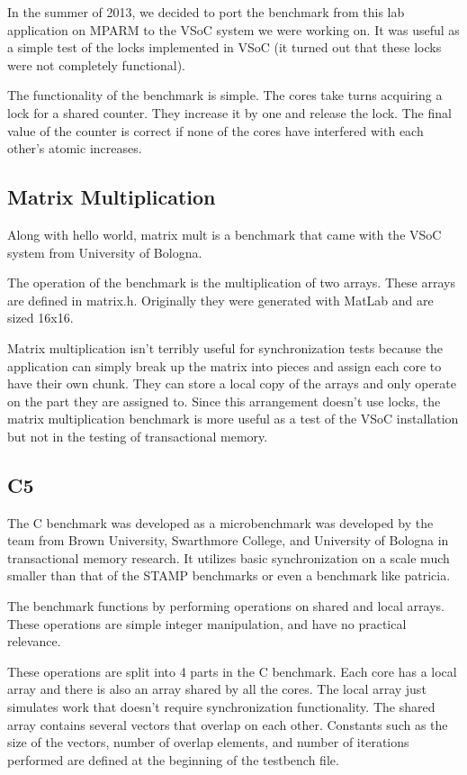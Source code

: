 \documentclass{article}
\begin{document}
In the summer of 2013, we decided to port the benchmark from this lab 
application on MPARM to the VSoC system we were working on.  It was useful as 
a simple test of the locks implemented in VSoC (it turned out that these locks 
were not completely functional).

The functionality of the benchmark is simple. The cores take turns acquiring a 
lock for a shared counter. They increase it by one and release the lock. The 
final value of the counter is correct if none of the cores have interfered 
with each other's atomic increases.

\subsection{Matrix Multiplication}

Along with hello world, matrix mult is a benchmark that came with the VSoC 
system from University of Bologna. 

The operation of the benchmark is the multiplication of two arrays. These 
arrays are defined in matrix.h. Originally they were generated with MatLab and 
are sized 16x16. 

Matrix multiplication isn't terribly useful for synchronization tests because 
the application can simply break up the matrix into pieces and assign each 
core to have their own chunk.  They can store a local copy of the arrays and 
only operate on the part they are assigned to. Since this arrangement doesn't 
use locks, the matrix multiplication benchmark is more useful as a test of the 
VSoC installation but not in the testing of transactional memory. 

\subsection{C5}

The C benchmark was developed as a microbenchmark was developed by the team
from Brown University, Swarthmore College, and University of Bologna in 
transactional memory research. It utilizes basic synchronization on a scale 
much smaller than that of the STAMP benchmarks or even a benchmark like 
patricia.

The benchmark functions by performing operations on shared and local arrays. 
These operations are simple integer manipulation, and have no practical 
relevance. 

These operations are split into 4 parts in the C benchmark. Each core has a 
local array and there is also an array shared by all the cores. The local 
array just simulates work that doesn't require synchronization functionality. 
The shared array contains several vectors that overlap on each other. 
Constants such as the size of the vectors, number of overlap elements, and 
number of iterations performed are defined at the beginning of the testbench
 file. 
\end{document}
